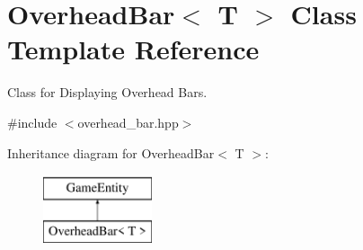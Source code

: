 \hypertarget{class_overhead_bar}{}\section{Overhead\+Bar$<$ T $>$ Class Template Reference}
\label{class_overhead_bar}


Class for Displaying Overhead Bars.  




{\ttfamily \#include $<$overhead\+\_\+bar.\+hpp$>$}

Inheritance diagram for Overhead\+Bar$<$ T $>$\+:\begin{figure}[H]
\begin{center}
\leavevmode
\includegraphics[height=2.000000cm]{class_overhead_bar}
\end{center}
\end{figure}
